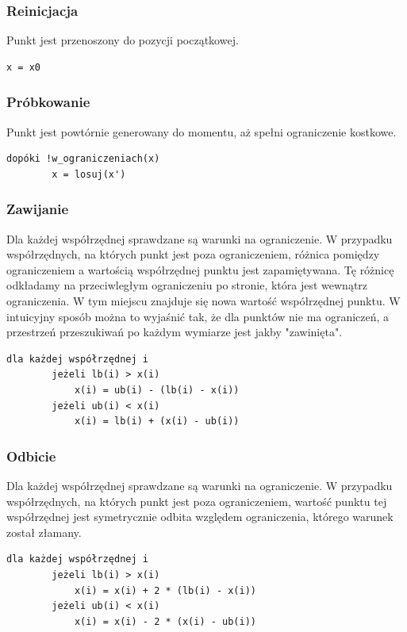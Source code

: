 \documentclass{mini}
\begin{document}
\subsubsection{Reinicjacja}
Punkt jest przenoszony do pozycji początkowej.

\begin{Verbatim}[baselinestretch=1.1]
	x = x0
\end{Verbatim}

\subsubsection{Próbkowanie}
Punkt jest powtórnie generowany do momentu, aż spełni ograniczenie kostkowe.

\begin{Verbatim}[baselinestretch=1.1]
	dopóki !w_ograniczeniach(x)
		x = losuj(x')
\end{Verbatim}

\subsubsection{Zawijanie}
Dla każdej współrzędnej sprawdzane są warunki na ograniczenie. W przypadku współrzędnych, na których punkt jest poza ograniczeniem, różnica pomiędzy ograniczeniem a wartością współrzędnej punktu jest zapamiętywana. Tę różnicę odkładamy na przeciwległym ograniczeniu po stronie, która jest wewnątrz ograniczenia. W tym miejscu znajduje się nowa wartość współrzędnej punktu. W intuicyjny sposób można to wyjaśnić tak, że dla punktów nie ma ograniczeń, a przestrzeń przeszukiwań po każdym wymiarze jest jakby "zawinięta".

\begin{Verbatim}[baselinestretch=1.1]
	dla każdej współrzędnej i
		jeżeli lb(i) > x(i)
			x(i) = ub(i) - (lb(i) - x(i))
		jeżeli ub(i) < x(i)
			x(i) = lb(i) + (x(i) - ub(i))
\end{Verbatim}

\subsubsection{Odbicie}
Dla każdej współrzędnej sprawdzane są warunki na ograniczenie. W przypadku współrzędnych, na których punkt jest poza ograniczeniem, wartość punktu tej współrzędnej jest symetrycznie odbita względem ograniczenia, którego warunek został złamany.

\begin{Verbatim}[baselinestretch=1.1]
	dla każdej współrzędnej i
		jeżeli lb(i) > x(i)
			x(i) = x(i) + 2 * (lb(i) - x(i))
		jeżeli ub(i) < x(i)
			x(i) = x(i) - 2 * (x(i) - ub(i))
\end{Verbatim}
\end{document}
